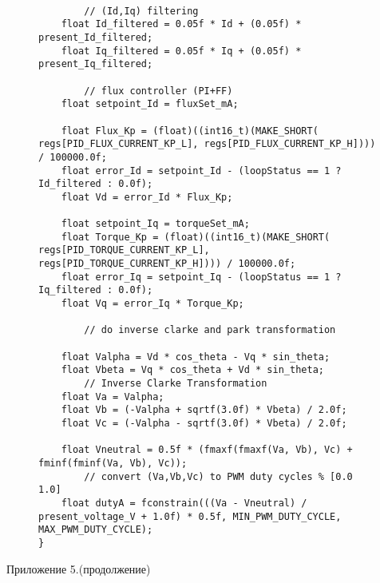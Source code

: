 \begin{figure}[H]
	\centering
	\begin{verbatim}

		// (Id,Iq) filtering
	float Id_filtered = 0.05f * Id + (0.05f) * present_Id_filtered;
    float Iq_filtered = 0.05f * Iq + (0.05f) * present_Iq_filtered;

    	// flux controller (PI+FF)
    float setpoint_Id = fluxSet_mA;

    float Flux_Kp = (float)((int16_t)(MAKE_SHORT( regs[PID_FLUX_CURRENT_KP_L], regs[PID_FLUX_CURRENT_KP_H]))) / 100000.0f;
    float error_Id = setpoint_Id - (loopStatus == 1 ? Id_filtered : 0.0f);
    float Vd = error_Id * Flux_Kp;

    float setpoint_Iq = torqueSet_mA;
    float Torque_Kp = (float)((int16_t)(MAKE_SHORT( regs[PID_TORQUE_CURRENT_KP_L], regs[PID_TORQUE_CURRENT_KP_H]))) / 100000.0f;
    float error_Iq = setpoint_Iq - (loopStatus == 1 ? Iq_filtered : 0.0f);
    float Vq = error_Iq * Torque_Kp;

		// do inverse clarke and park transformation

    float Valpha = Vd * cos_theta - Vq * sin_theta;
    float Vbeta = Vq * cos_theta + Vd * sin_theta;
        // Inverse Clarke Transformation
    float Va = Valpha;
    float Vb = (-Valpha + sqrtf(3.0f) * Vbeta) / 2.0f;
    float Vc = (-Valpha - sqrtf(3.0f) * Vbeta) / 2.0f;

    float Vneutral = 0.5f * (fmaxf(fmaxf(Va, Vb), Vc) + fminf(fminf(Va, Vb), Vc));
    	// convert (Va,Vb,Vc) to PWM duty cycles % [0.0 1.0]
	float dutyA = fconstrain(((Va - Vneutral) / present_voltage_V + 1.0f) * 0.5f, MIN_PWM_DUTY_CYCLE, MAX_PWM_DUTY_CYCLE);
}	\end{verbatim}
\end{figure}
\newpage
\hfill \large Приложение 5.(продолжение)

